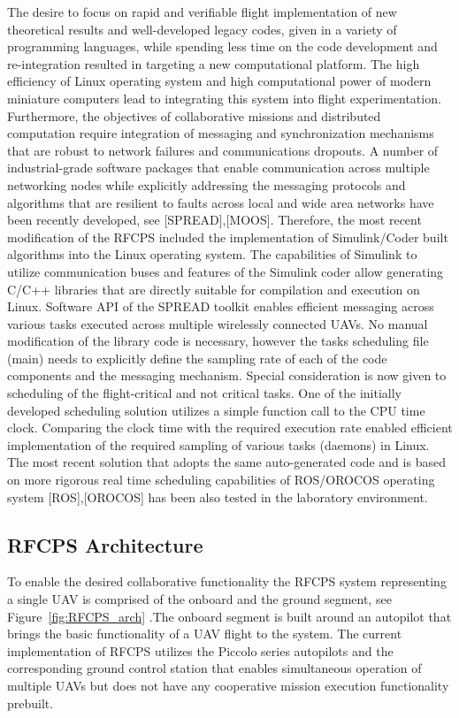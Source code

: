 \documentclass[letterpaper, 10 pt, conference]{ieeeconf}  %
\begin{document}
The desire to focus on rapid and verifiable flight implementation of new theoretical results and well-developed legacy codes, given in a variety of programming languages, while spending less time on the code development and re-integration resulted in targeting a new computational platform. The high efficiency of Linux operating system and high computational power of modern miniature computers lead to integrating this system into flight experimentation. Furthermore, the objectives of collaborative missions and distributed computation require integration of messaging and synchronization mechanisms that are robust to network failures and communications dropouts. A number of industrial-grade software packages that enable communication across multiple networking nodes while explicitly addressing the messaging protocols and algorithms that are resilient to faults across local and wide area networks have been recently developed, see [SPREAD],[MOOS]. Therefore, the most recent modification of the RFCPS included the implementation of Simulink/Coder built algorithms into the Linux operating system. The capabilities of Simulink to utilize communication buses and features of the Simulink coder allow generating C/C++ libraries that are directly suitable for compilation and execution on Linux. Software API of the SPREAD toolkit enables efficient messaging across various tasks executed across multiple wirelessly connected UAVs. No manual modification of the library code is necessary, however the tasks scheduling file (main) needs to explicitly define the sampling rate of each of the code components and the messaging mechanism. Special consideration is now given to scheduling of the flight-critical and not critical tasks. One of the initially developed scheduling solution utilizes a simple function call to the CPU time clock. Comparing the clock time with the required execution rate enabled efficient implementation of the required sampling of various tasks (daemons) in Linux. The most recent solution that adopts the same auto-generated code and is based on more rigorous real time scheduling capabilities of ROS/OROCOS operating system [ROS],[OROCOS] has been also tested in the laboratory environment.

\subsection{RFCPS Architecture}

To enable the desired collaborative functionality the RFCPS system representing a single UAV is  comprised of the onboard and the ground segment, see Figure~\ref{fig:RFCPS_arch} .The onboard segment is built around an autopilot that brings the basic functionality of a UAV flight to the system. The current implementation of RFCPS utilizes the Piccolo series autopilots and the corresponding ground control station that enables simultaneous operation of multiple UAVs but does not have any cooperative mission execution functionality prebuilt. 
\end{document}
